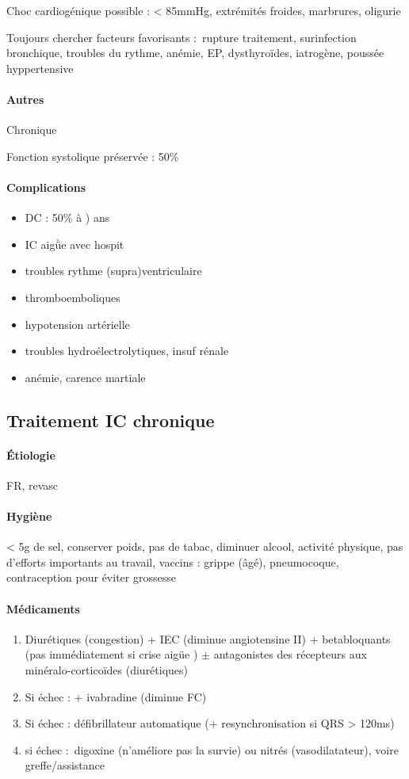 \documentclass{article}
\begin{document}
Choc cardiogénique possible : < 85mmHg, extrémités froides, marbrures, oligurie

Toujours chercher facteurs favorisants : rupture traitement, surinfection
bronchique, troubles du rythme, anémie, EP, dysthyroïdes, iatrogène, poussée
hyppertensive

\paragraph{Autres}
Chronique

Fonction systolique préservée : 50\%

\paragraph{Complications}
\begin{itemize}
  \item DC : 50\% à ) ans
  \item IC aigǜe avec hospit
  \item troubles rythme (supra)ventriculaire
  \item thromboemboliques
  \item hypotension artérielle
  \item troubles hydroélectrolytiques, insuf rénale
  \item anémie, carence martiale
\end{itemize}

\subsection{Traitement IC chronique}
\paragraph{Étiologie}
FR, revasc

\paragraph{Hygiène}
< 5g de sel, conserver poids, pas de tabac, diminuer alcool, activité physique,
pas d'efforts importants au travail, vaccins : grippe (âgé), pneumocoque,
contraception pour éviter grossesse

\paragraph{Médicaments}
\begin{enumerate}
  \item Diurétiques (congestion) + IEC (diminue angiotensine II) + betabloquants
    (\skull pas immédiatement si crise aigüe \danger{}) $\pm$ antagonistes des
    récepteurs aux minéralo-corticoïdes (diurétiques)
  \item Si échec : + ivabradine (diminue FC)
  \item Si échec : défibrillateur automatique (+ resynchronisation si QRS >
    120ms)
  \item si échec : digoxine (n'améliore pas la survie) ou nitrés (vasodilatateur), voire greffe/assistance
\end{enumerate}
\end{document}
